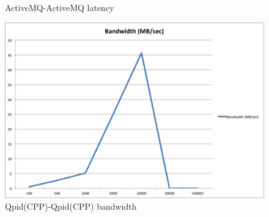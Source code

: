 \documentclass{thesis}
\begin{document}
\begin{figure}[tb] 
\centering
\caption{ActiveMQ-ActiveMQ latency}
\label{activemq-activemq-latency}
\end{figure}

\begin{figure}[h] 
\centering
\includegraphics{qpid_qpid_bandwidth.png}
\caption{Qpid(CPP)-Qpid(CPP) bandwidth}
\label{qpid-qpid-bandwidth}
\end{figure}
\end{document}
